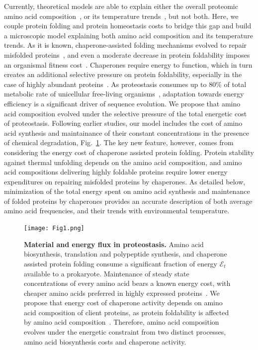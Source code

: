 \documentclass[10pt,letterpaper]{article}
\begin{document}
Currently, theoretical models are able to explain either the overall proteomic amino acid composition~\cite{Seligmann2003CostMinimization,Heizer2011Amino,Krick2014Amino}, or its temperature trends~\cite{Berezovsky2007Positive,Venev2015Massively}, but not both. Here, we couple protein folding and protein homeostasis costs to bridge this gap and build a microscopic model explaining both amino acid composition and its temperature trends. As it is known, chaperone-assisted folding mechanisms evolved to repair misfolded proteins~\cite{Hartl2011Molecular}, and even a moderate decrease in protein foldability imposes an organismal fitness cost~\cite{Drummond2008MistranslationInduced,Samerotte2011Misfolded}. Chaperones require energy to function, which in turn creates an additional selective pressure on protein foldability, especially in the case of highly abundant proteins~\cite{Kepp2014Model}. As proteostasis consumes up to 80\% of total metabolic rate of unicellular free-living organisms~\cite{Kepp2014Model}, adaptation towards energy efficiency is a significant driver of sequence evolution. We propose that amino acid composition evolved under the selective pressure of the total energetic cost of proteostasis. Following earlier studies, our model includes the cost of amino acid synthesis and maintainance of their constant concentrations in the presence of chemical degradation, Fig.~\ref{fig:fig1}. The key new feature, however, comes from considering the energy cost of chaperone assisted protein folding. Protein stability against thermal unfolding depends on the amino acid composition, and amino acid compositions delivering highly foldable proteins require lower energy expenditures on repairing misfolded proteins by chaperones. As detailed below, minimization of the total energy spent on amino acid synthesis and maintenance of folded proteins by chaperones provides an accurate description of both average amino acid frequencies, and their trends with environmental temperature.


\begin{figure}[h!]
\texttt{[image: Fig1.png]}
\caption{
{\bf Material and energy flux in proteostasis.}  Amino acid biosynthesis, translation and polypeptide synthesis, and chaperone assisted protein folding consume a significant fraction of energy $\mathcal{E}_{t}$ available to a prokaryote. Maintenance of steady state concentrations of every amino acid bears a known energy cost, with cheaper amino acids preferred in highly expressed proteins~\cite{Akashi2002Metabolic}. We propose that energy cost of chaperone activity depends on amino acid composition of client proteins, as protein foldability is affected by amino acid composition~\cite{Dill1985Theory,Berezovsky2007Positive,Venev2015Massively}. Therefore, amino acid composition evolves under the energetic constraint from two distinct processes, amino acid biosynthesis costs and chaperone activity.
}
\label{fig:fig1}
\end{figure}
\end{document}

